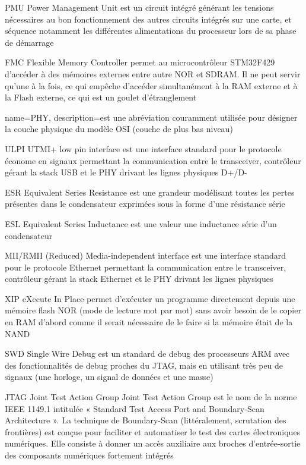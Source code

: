 {PMU}
{Power Management Unit}
{est un circuit intégré générant les tensions nécessaires au bon fonctionnement des autres circuits intégrés sur une carte, et séquence notamment les différentes alimentations du processeur lors de sa phase de démarrage}

{FMC}
{Flexible Memory Controller}
{permet au microcontrôleur STM32F429 d'accéder à des mémoires externes entre autre NOR et SDRAM. Il ne peut servir qu'une à la fois, ce qui empêche d'accéder simultanément à la RAM externe et à la Flash externe, ce qui est un goulet d'étranglement}

{
	name=PHY,
	description={est une abréviation couramment utilisée pour désigner la couche physique du modèle OSI (couche de plus bas niveau)}
}

{ULPI}
{UTMI+ low pin interface}
{est une interface standard pour le protocole économe en signaux permettant la communication entre le transceiver, contrôleur gérant la stack USB et le PHY drivant les lignes physiques D+/D-}
    
{ESR}
{Equivalent Series Resistance}
{est une grandeur modélisant toutes les pertes présentes dans le condensateur exprimées sous la forme d'une résistance série}
    
{ESL}
{Equivalent Series Inductance}
{est une valeur une inductance série d'un condensateur}


{MII/RMII}
{(Reduced) Media-independent interface}
{est une interface standard pour le protocole Ethernet permettant la communication entre le transceiver, contrôleur gérant la stack Ethernet et le PHY drivant les lignes physiques}


{XIP}
{eXecute In Place}
{permet d'exécuter un programme directement depuis une mémoire flash NOR (mode de lecture mot par mot) sans avoir besoin de le copier en RAM d'abord comme il serait nécessaire de le faire si la mémoire était de la NAND}

{SWD}
{Single Wire Debug}
{est un standard de debug des processeurs ARM avec des fonctionnalités de debug proches du JTAG, mais en utilisant très peu de signaux (une horloge, un signal de données et une masse)}


{JTAG}
{Joint Test Action Group}
{Joint Test Action Group est le nom de la norme IEEE 1149.1 intitulée « Standard Test Access Port and Boundary-Scan Architecture ». La technique de Boundary-Scan (littéralement, scrutation des frontières) est conçue pour faciliter et automatiser le test des cartes électroniques numériques. Elle consiste à donner un accès auxiliaire aux broches d'entrée-sortie des composants numériques fortement intégrés
}

